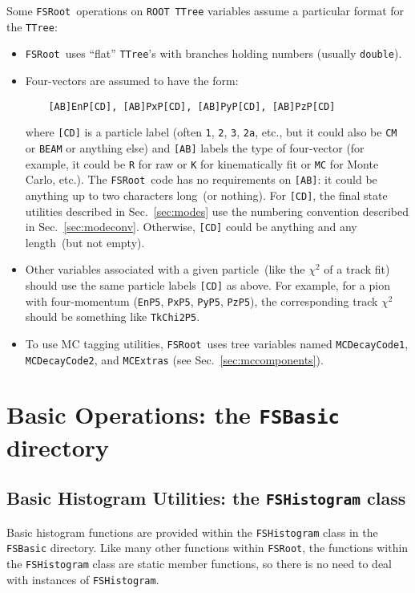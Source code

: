 \documentclass[11pt]{article}
\newcommand{\FSR}{{\tt FSRoot}}
\newcommand{\ROOT}{{\tt ROOT}}
\begin{document}
Some \FSR\ operations on \ROOT\ {\tt TTree} variables assume a particular format for the {\tt TTree}:
\begin{itemize}

\item \FSR\ uses ``flat'' {\tt TTree}'s with branches holding numbers (usually {\tt double}).

\item Four-vectors are assumed to have the form:
\begin{verbatim}
    [AB]EnP[CD], [AB]PxP[CD], [AB]PyP[CD], [AB]PzP[CD]
\end{verbatim}
where {\tt [CD]} is a particle label (often {\tt 1}, {\tt 2}, {\tt 3}, {\tt 2a}, etc., but it could also be {\tt CM} or {\tt BEAM} or anything else) and {\tt [AB]} labels the type of four-vector (for example, it could be {\tt R} for raw or {\tt K} for kinematically fit or {\tt MC} for Monte Carlo, etc.).  The \FSR\ code has no requirements on {\tt [AB]}: it could be anything up to two characters long~(or nothing).  For {\tt [CD]}, the final state utilities described in Sec.~\ref{sec:modes} use the numbering convention described in Sec.~\ref{sec:modeconv}.  
Otherwise, {\tt [CD]} could be anything and any length~(but not empty).

\item Other variables associated with a given particle~(like the $\chi^2$ of a track fit) should use the same particle labels {\tt [CD]} as above.  For example, for a pion with four-momentum ({\tt EnP5}, {\tt PxP5}, {\tt PyP5}, {\tt PzP5}), the corresponding track $\chi^2$ should be something like {\tt TkChi2P5}.

\item To use MC tagging utilities, \FSR\ uses tree variables named {\tt MCDecayCode1}, {\tt MCDecayCode2}, and {\tt MCExtras} (see Sec.~\ref{sec:mccomponents}).

\end{itemize}

\section{Basic Operations:  the {\tt FSBasic} directory}

\subsection{Basic Histogram Utilities: the {\tt FSHistogram} class}
\label{sec:hist}

Basic histogram functions are provided within the {\tt FSHistogram} class in the {\tt FSBasic} directory.  Like many other functions within \FSR, the functions within the {\tt FSHistogram} class are static member functions, so there is no need to deal with instances of {\tt FSHistogram}.
\end{document}
